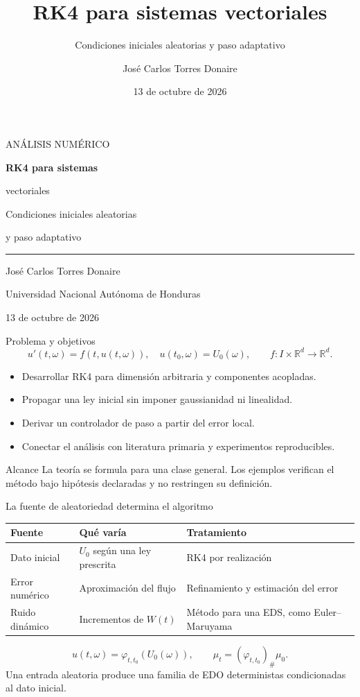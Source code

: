 \documentclass[aspectratio=169,11pt]{beamer}
\title{RK4 para sistemas vectoriales}
\subtitle{Condiciones iniciales aleatorias y paso adaptativo}
\author{José Carlos Torres Donaire}
\institute{Universidad Nacional Autónoma de Honduras}
\date{13 de octubre de 2026}
\newcommand{\R}{\mathbb R}\newcommand{\E}{\mathbb E}
\begin{document}
\begin{frame}[plain]
\vspace{0.6cm}
{\color{teal}\small ANÁLISIS NUMÉRICO}\par\vspace{0.5cm}
{\color{navy}\fontsize{28}{32}\selectfont\bfseries RK4 para sistemas\par vectoriales}\par\vspace{0.5cm}
{\Large Condiciones iniciales aleatorias\par y paso adaptativo}\par\vspace{0.7cm}
\textcolor{teal}{\rule{12.7cm}{1pt}}\par\vspace{0.3cm}
José Carlos Torres Donaire\par
{\small Universidad Nacional Autónoma de Honduras\par13 de octubre de 2026}
\end{frame}

\begin{frame}{Problema y objetivos}
\[
u'(t,\omega)=f(t,u(t,\omega)),\quad u(t_0,\omega)=U_0(\omega),
\qquad f:I\times\R^d\to\R^d.
\]
\begin{itemize}
\item Desarrollar RK4 para dimensión arbitraria y componentes acopladas.
\item Propagar una ley inicial sin imponer gaussianidad ni linealidad.
\item Derivar un controlador de paso a partir del error local.
\item Conectar el análisis con literatura primaria y experimentos reproducibles.
\end{itemize}
\begin{block}{Alcance}
La teoría se formula para una clase general. Los ejemplos verifican el método
bajo hipótesis declaradas y no restringen su definición.
\end{block}
\end{frame}

\begin{frame}{La fuente de aleatoriedad determina el algoritmo}
\renewcommand{\arraystretch}{1.35}
\begin{tabularx}{0.98\linewidth}{@{}p{3.2cm}XX@{}}\toprule
Fuente & Qué varía & Tratamiento\\\midrule
Dato inicial & $U_0$ según una ley prescrita & RK4 por realización\\
Error numérico & Aproximación del flujo & Refinamiento y estimación del error\\
Ruido dinámico & Incrementos de $W(t)$ & Método para una EDS, como Euler--Maruyama\\\bottomrule
\end{tabularx}\par
\vspace{0.4cm}
\[
u(t,\omega)=\varphi_{t,t_0}(U_0(\omega)),\qquad
\mu_t=(\varphi_{t,t_0})_\#\mu_0.
\]
Una entrada aleatoria produce una familia de EDO deterministas condicionadas
al dato inicial.
\end{frame}
\end{document}
